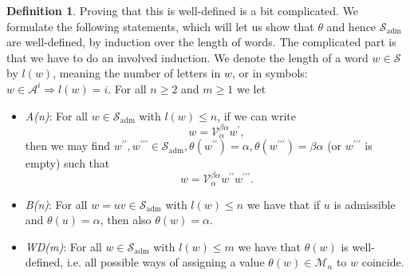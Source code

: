 \documentclass[10pt, a4paper, UKenglish]{article}
\numberwithin{equation}{section}
\newcommand{\cM}{\mathcal{M}}
\newcommand{\cS}{\mathcal{S}}
\newcommand{\cV}{\mathcal{V}}
\newcommand{\cA}{\mathcal{A}}
\theoremstyle{plain}
\theoremstyle{definition}
\newtheorem{defn}[equation]{Definition}
\begin{document}
\begin{defn}
Proving that this is well-defined is a bit complicated. We formulate the following statements, which will let us show that $\theta$ and hence $\cS_{\mathrm{adm}}$ are well-defined, by induction over the length of words.  The complicated part is that we have to do an involved induction. We denote the length of a word $w \in \cS$ by $l(w)$, meaning the number of letters in $w$, or in symbols: $w \in \cA^i \Rightarrow l(w) = i$.
For all $n \geq 2$ and $m \geq 1$ we let
\begin{itemize}
\item[] \emph{A(n)}: For all $w \in \cS_{\mathrm{adm}}$ with $l(w) \leq n$, if we can write
	\begin{equation*}
	w = \cV^{\beta\alpha}_\alpha w^\prime,
	\end{equation*}
	then we may find 	$w^{\prime\prime}, w^{\prime\prime\prime} \in \cS_{\mathrm{adm}}, \theta(w^{\prime\prime}) = \alpha, \theta(w^{\prime\prime\prime}) = \beta\alpha$ (or $w^{\prime\prime\prime}$ is empty) such that
	\begin{equation*}
	w = \cV_\alpha^{\beta\alpha} w^{\prime\prime} w^{\prime\prime\prime}.
	\end{equation*}
\item[] \emph{B(n)}: For all $w = uv \in \cS_{\mathrm{adm}}$ with $l(w) \leq n$ we have that if $u$ is admissible and $\theta(u) = \alpha$, then also $\theta(w) = \alpha$.
\item[] \emph{WD(m)}: For all $w \in \cS_{\mathrm{adm}}$ with $l(w) \leq m$ we have that $\theta(w)$ is well-defined, i.e. all possible ways of assigning a value $\theta(w) \in \cM_n$ to $w$ coincide.
\end{itemize}
\end{defn}
%
%
\end{document}
